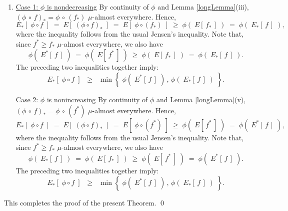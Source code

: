 \begin{enumerate}
\item
	\underline{Case 1: $\phi$ is nondecreasing}
	\vskip 0.0cm
	\noindent
	By continuity of $\phi$ and Lemma \ref{longLemma}(iii),
	$(\phi\,\circ\,f)_{*} = \phi\,\circ\,(f_{*})$ $\mu$-almost everywhere.
	Hence,
	\begin{equation*}
	E_{*}\!\left[\;\phi \circ f\;\right]
		\;=\; E\!\left[\;(\phi \circ f)_{*}\;\right]
		\;=\; E\!\left[\;\phi \circ (f_{*})\;\right]
		\;\geq\; \phi(\;E[\,f_{*}\,]\;)
		\;=\; \phi(\;E_{*}[\,f\,]\;),
	\end{equation*}
	where the inequality follows from the usual Jensen's inequality.
	Note that, since $f^{*} \geq f_{*}$ $\mu$-almost everywhere, we also have
	\begin{equation*}
	\phi(\;E^{*}[\,f\,]\;)
		\;=\; \phi(\;E[\,f^{*}\,]\;)
		\;\geq\; \phi(\;E[\,f_{*}\,]\;)
		\;=\; \phi(\;E_{*}[\,f\,]\;).
	\end{equation*}
	The preceding two inequalities together imply:
	\begin{equation*}
	E_{*}\!\left[\;\phi \circ f\;\right]
		\;\;\geq\;\; \min\!\left\{\;\phi(\;E^{*}[\,f\,]\;) \,,\, \phi(\;E_{*}[\,f\,]\;)\;\right\}.
	\end{equation*}

	\underline{Case 2: $\phi$ is nonincreasing}
	\vskip 0.0cm
	\noindent
	By continuity of $\phi$ and Lemma \ref{longLemma}(v),
	$(\phi\,\circ\,f)_{*} = \phi\,\circ\,(f^{*})$ $\mu$-almost everywhere.
	Hence,
	\begin{equation*}
	E_{*}\!\left[\;\phi \circ f\;\right]
		\;=\; E\!\left[\;(\phi \circ f)_{*}\;\right]
		\;=\; E\!\left[\;\phi \circ (f^{*})\;\right]
		\;\geq\; \phi(\;E[\,f^{*}\,]\;)
		\;=\; \phi(\;E^{*}[\,f\,]\;),
	\end{equation*}
	where the inequality follows from the usual Jensen's inequality.
	Note that, since $f^{*} \geq f_{*}$ $\mu$-almost everywhere, we also have
	\begin{equation*}
	\phi(\;E_{*}[\,f\,]\;)
		\;=\; \phi(\;E[\,f_{*}\,]\;)
		\;\geq\; \phi(\;E[\,f^{*}\,]\;)
		\;=\; \phi(\;E^{*}[\,f\,]\;).
	\end{equation*}
	The preceding two inequalities together imply:
	\begin{equation*}
	E_{*}\!\left[\;\phi \circ f\;\right]
		\;\;\geq\;\; \min\!\left\{\;\phi(\;E^{*}[\,f\,]\;) \,,\, \phi(\;E_{*}[\,f\,]\;)\;\right\}.
	\end{equation*}
\end{enumerate}
This completes the proof of the present Theorem.
\qed



\renewcommand{\theenumi}{\roman{enumi}}
\renewcommand{\labelenumi}{\textnormal{(\theenumi)}$\;\;$}

